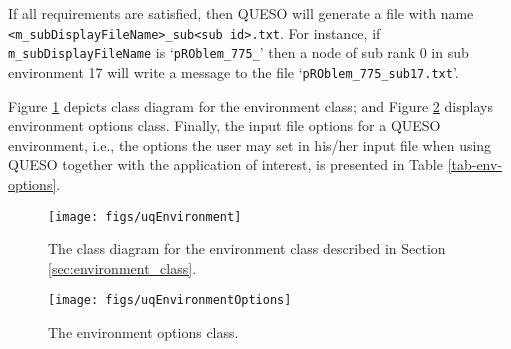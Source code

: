 If all requirements are satisfied, then QUESO will generate a file with name \linebreak 
\verb+<m_subDisplayFileName>_sub<sub id>.txt+.   For instance, if \verb+m_subDisplayFileName+ is `\verb+pROblem_775_+' then a node of sub rank 0 in sub environment 17 will write a message to the file `\verb+pROblem_775_sub17.txt+'.

Figure \ref{fig-env-class} depicts class diagram for the environment class; and Figure  \ref{fig-env-options-class} displays environment options class. %
 Finally, the input file options for a QUESO environment, i.e., the options the user may set in his/her input file when using QUESO together with the application of interest, is presented in Table \ref{tab-env-options}.

\begin{figure}[!hp]
\centering
\texttt{[image: figs/uqEnvironment]}
\vspace*{-24pt}
\caption{The class diagram for the environment class described in Section \ref{sec:environment_class}.}
\label{fig-env-class}
\end{figure}

\begin{figure}[htpb]
\centering
\texttt{[image: figs/uqEnvironmentOptions]}
\vspace*{-8pt}
\caption{The environment options class.}
\label{fig-env-options-class}
\end{figure}



